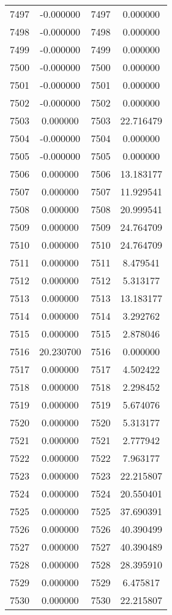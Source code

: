 \documentclass[12pt]{article}
\begin{document}
\begin{longtable}{@{}cccc@{}}
7497 & -0.000000 & 7497 & 0.000000 \\
7498 & -0.000000 & 7498 & 0.000000 \\
7499 & -0.000000 & 7499 & 0.000000 \\
7500 & -0.000000 & 7500 & 0.000000 \\
7501 & -0.000000 & 7501 & 0.000000 \\
7502 & -0.000000 & 7502 & 0.000000 \\
7503 & 0.000000 & 7503 & 22.716479 \\
7504 & -0.000000 & 7504 & 0.000000 \\
7505 & -0.000000 & 7505 & 0.000000 \\
7506 & 0.000000 & 7506 & 13.183177 \\
7507 & 0.000000 & 7507 & 11.929541 \\
7508 & 0.000000 & 7508 & 20.999541 \\
7509 & 0.000000 & 7509 & 24.764709 \\
7510 & 0.000000 & 7510 & 24.764709 \\
7511 & 0.000000 & 7511 & 8.479541 \\
7512 & 0.000000 & 7512 & 5.313177 \\
7513 & 0.000000 & 7513 & 13.183177 \\
7514 & 0.000000 & 7514 & 3.292762 \\
7515 & 0.000000 & 7515 & 2.878046 \\
7516 & 20.230700 & 7516 & 0.000000 \\
7517 & 0.000000 & 7517 & 4.502422 \\
7518 & 0.000000 & 7518 & 2.298452 \\
7519 & 0.000000 & 7519 & 5.674076 \\
7520 & 0.000000 & 7520 & 5.313177 \\
7521 & 0.000000 & 7521 & 2.777942 \\
7522 & 0.000000 & 7522 & 7.963177 \\
7523 & 0.000000 & 7523 & 22.215807 \\
7524 & 0.000000 & 7524 & 20.550401 \\
7525 & 0.000000 & 7525 & 37.690391 \\
7526 & 0.000000 & 7526 & 40.390499 \\
7527 & 0.000000 & 7527 & 40.390489 \\
7528 & 0.000000 & 7528 & 28.395910 \\
7529 & 0.000000 & 7529 & 6.475817 \\
7530 & 0.000000 & 7530 & 22.215807 \\

\end{longtable}
\end{document}
